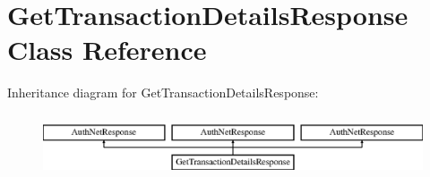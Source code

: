 \hypertarget{interface_get_transaction_details_response}{
\section{GetTransactionDetailsResponse Class Reference}
\label{interface_get_transaction_details_response}
}
Inheritance diagram for GetTransactionDetailsResponse:\begin{figure}[H]
\begin{center}
\leavevmode
\includegraphics[height=1.885522cm]{interface_get_transaction_details_response}
\end{center}
\end{figure}
